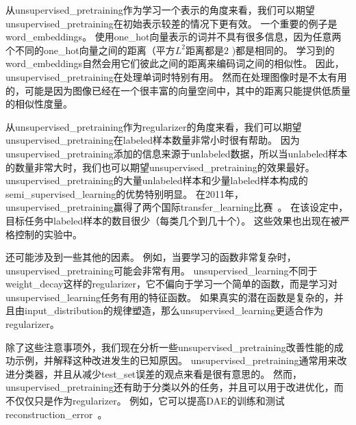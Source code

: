 
从\gls{unsupervised_pretraining}作为学习一个表示的角度来看，我们可以期望\gls{unsupervised_pretraining}在初始表示较差的情况下更有效。
一个重要的例子是\gls{word_embeddings}。
使用\gls{one_hot}向量表示的词并不具有很多信息，因为任意两个不同的\gls{one_hot}向量之间的距离（平方$L^2$距离都是$2$ )都是相同的。
学习到的\gls{word_embeddings}自然会用它们彼此之间的距离来编码词之间的相似性。
因此，\gls{unsupervised_pretraining}在处理单词时特别有用。
然而在处理图像时是不太有用的，可能是因为图像已经在一个很丰富的向量空间中，其中的距离只能提供低质量的相似性度量。


从\gls{unsupervised_pretraining}作为\gls{regularizer}的角度来看，我们可以期望\gls{unsupervised_pretraining}在\gls{labeled}样本数量非常小时很有帮助。
因为\gls{unsupervised_pretraining}添加的信息来源于\gls{unlabeled}数据，所以当\gls{unlabeled}样本的数量非常大时，我们也可以期望\gls{unsupervised_pretraining}的效果最好。
\gls{unsupervised_pretraining}的大量\gls{unlabeled}样本和少量\gls{labeled}样本构成的\gls{semi_supervised_learning}的优势特别明显。
在2011年，\gls{unsupervised_pretraining}赢得了两个国际\gls{transfer_learning}比赛~\citep{UTLC+LISA-2011-small,goodfellow+all-NIPS2011}。
在该设定中，目标任务中\gls{labeled}样本的数目很少（每类几个到几十个）。
这些效果也出现在被\citet{paine2014analysis}严格控制的实验中。


还可能涉及到一些其他的因素。
例如，当要学习的函数非常复杂时，\gls{unsupervised_pretraining}可能会非常有用。
\gls{unsupervised_learning}不同于\gls{weight_decay}这样的\gls{regularizer}，它不偏向于学习一个简单的函数，而是学习对\gls{unsupervised_learning}任务有用的特征函数。
如果真实的潜在函数是复杂的，并且由\gls{input_distribution}的规律塑造，那么\gls{unsupervised_learning}更适合作为\gls{regularizer}。


除了这些注意事项外，我们现在分析一些\gls{unsupervised_pretraining}改善性能的成功示例，并解释这种改进发生的已知原因。
\gls{unsupervised_pretraining}通常用来改进分类器，并且从减少\gls{test_set}误差的观点来看是很有意思的。
然而，\gls{unsupervised_pretraining}还有助于分类以外的任务，并且可以用于改进优化，而不仅仅只是作为\gls{regularizer}。
例如，它可以提高\gls{DAE}的训练和测试\gls{reconstruction_error}~\citep{Hinton-Science2006}。


